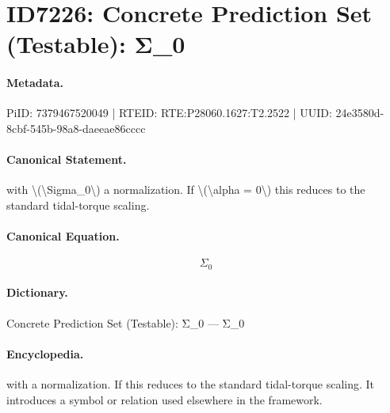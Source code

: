 \section*{ID7226: Concrete Prediction Set (Testable): Σ\_0}
\paragraph{Metadata.}
PiID: 7379467520049 | RTEID: RTE:P28060.1627:T2.2522 | UUID: 24e3580d-8cbf-545b-98a8-daeeae86cccc

\paragraph{Canonical Statement.}
with \textbackslash{}(\textbackslash{}Sigma\_0\textbackslash{}) a normalization. If \textbackslash{}(\textbackslash{}alpha = 0\textbackslash{}) this reduces to the standard tidal-torque scaling.

\paragraph{Canonical Equation.}
\[
\Sigma_0
\]

\paragraph{Dictionary.}
Concrete Prediction Set (Testable): Σ\_0 — Σ\_0

\paragraph{Encyclopedia.}
with a normalization. If this reduces to the standard tidal-torque scaling. It introduces a symbol or relation used elsewhere in the framework.

